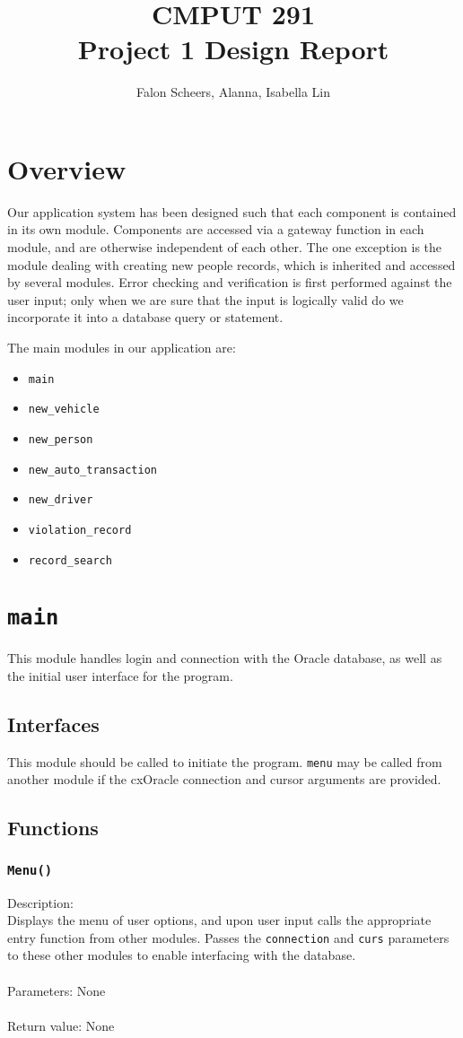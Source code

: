 \documentclass[12pt]{article}
\title{CMPUT 291 \\ Project 1 Design Report}
\author{Falon Scheers, Alanna, Isabella Lin}
\begin{document}
\maketitle
\newpage
\tableofcontents
\newpage
\section{Overview}
Our application system has been designed such that each component is contained in its own module. Components are accessed via a gateway function in each module, and are otherwise independent of each other. The one exception is the module dealing with creating new people records, which is inherited and accessed by several modules. Error checking and verification is first performed against the user input; only when we are sure that the input is logically valid do we incorporate it into a database query or statement.


The main modules in our application are:
\begin{itemize}
\item \texttt{main}
\item \texttt{new\_vehicle}
\item \texttt{new\_person}
\item \texttt{new\_auto\_transaction}
\item \texttt{new\_driver}
\item \texttt{violation\_record}
\item \texttt{record\_search}
\end{itemize}

\newpage
\section{\texttt{main}}

This module handles login and connection with the Oracle database, as well as the initial user interface for the program.
\subsection{Interfaces}
This module should be called to initiate the program. \texttt{menu} may be called from another module if the cxOracle connection and cursor arguments are provided.

\subsection{Functions}
\subsubsection{\texttt{Menu()}}
Description: \\
\indent Displays the menu of user options, and upon user input calls the appropriate entry function from other modules. Passes the \texttt{connection} and \texttt{curs} parameters to these other modules to enable interfacing with the database.\\\\
Parameters: None\\\\
Return value: None
\end{document}
